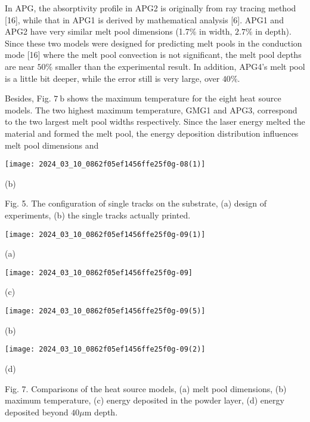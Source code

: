 \documentclass[10pt]{article}
\begin{document}
In APG, the absorptivity profile in APG2 is originally from ray tracing method [16], while that in APG1 is derived by mathematical analysis [6]. APG1 and APG2 have very similar melt pool dimensions (1.7\% in width, $2.7 \%$ in depth). Since these two models were designed for predicting melt pools in the conduction mode [16] where the melt pool convection is not significant, the melt pool depths are near $50 \%$ smaller than the experimental result. In addition, APG4's melt pool is a little bit deeper, while the error still is very large, over $40 \%$.

Besides, Fig. $7 \mathrm{~b}$ shows the maximum temperature for the eight heat source models. The two highest maximum temperature, GMG1 and APG3, correspond to the two largest melt pool widths respectively. Since the laser energy melted the material and formed the melt pool, the energy deposition distribution influences melt pool dimensions and

\begin{center}
\texttt{[image: 2024\_03\_10\_0862f05ef1456ffe25f0g-08(1)]}
\end{center}

(b)

Fig. 5. The configuration of single tracks on the substrate, (a) design of experiments, (b) the single tracks actually printed.

\begin{center}
\texttt{[image: 2024\_03\_10\_0862f05ef1456ffe25f0g-09(1)]}
\end{center}

(a)

\begin{center}
\texttt{[image: 2024\_03\_10\_0862f05ef1456ffe25f0g-09]}
\end{center}

(c)

\begin{center}
\texttt{[image: 2024\_03\_10\_0862f05ef1456ffe25f0g-09(5)]}
\end{center}

(b)

\begin{center}
\texttt{[image: 2024\_03\_10\_0862f05ef1456ffe25f0g-09(2)]}
\end{center}

(d)

Fig. 7. Comparisons of the heat source models, (a) melt pool dimensions, (b) maximum temperature, (c) energy deposited in the powder layer, (d) energy deposited beyond $40 \mu \mathrm{m}$ depth.
\end{document}
